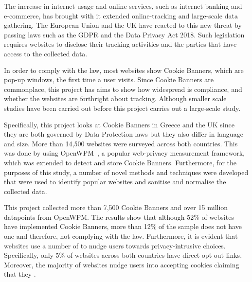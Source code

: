 \documentclass[../main.tex]{subfiles}
\begin{document}
The increase in internet usage and online services, such as internet banking and e-commerce, has brought with it extended online-tracking and large-scale data gathering. The European Union and the UK have reacted to this new threat by passing laws such as the GDPR and the Data Privacy Act 2018. Such legislation requires websites to disclose their tracking activities and the parties that have access to the collected data. 

In order to comply with the law, most websites show Cookie Banners, which are pop-up windows, the first time a user visits. Since Cookie Banners are commonplace, this project has aims to show how widespread is compliance, and whether the websites are forthright about tracking. Although smaller scale studies have been carried out before this project carries out a large-scale study.

Specifically, this project looks at Cookie Banners in Greece and the UK since they are both governed by Data Protection laws but they also differ in language and size. More than 14,500 websites were surveyed across both countries. This was done by using OpenWPM~\cite{englehardt2016online}, a popular web-privacy measurement framework, which was extended to detect and store Cookie Banners. Furthermore, for the purposes of this study, a number of novel methods and techniques were developed that were used to identify popular websites and sanitise and normalise the collected data.

This project collected more than 7,500 Cookie Banners and over 15 million datapoints from OpenWPM. The results show that although 52\% of websites have implemented Cookie Banners, more than 12\% of the sample does not have one and therefore, not complying with the law. Furthermore, it is evident that websites use a number of  to nudge users towards privacy-intrusive choices. Specifically, only 5\% of websites across both countries have direct opt-out links. Moreover, the majority of websites nudge users into accepting cookies claiming that they .
\end{document}
